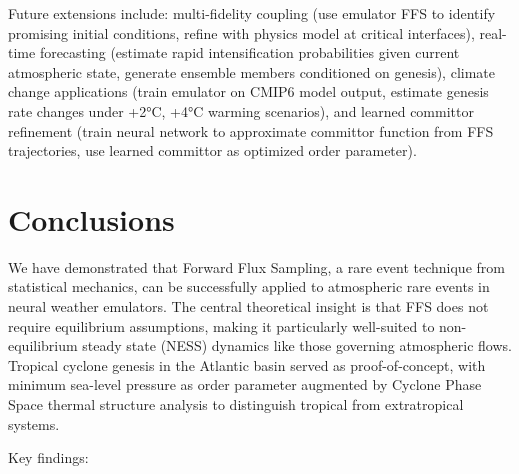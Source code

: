 \documentclass[11pt]{article}
\begin{document}
Future extensions include: multi-fidelity coupling (use emulator FFS to identify promising initial conditions, refine with physics model at critical interfaces), real-time forecasting (estimate rapid intensification probabilities given current atmospheric state, generate ensemble members conditioned on genesis), climate change applications (train emulator on CMIP6 model output, estimate genesis rate changes under +2°C, +4°C warming scenarios), and learned committor refinement (train neural network to approximate committor function from FFS trajectories, use learned committor as optimized order parameter).


\section{Conclusions}

We have demonstrated that Forward Flux Sampling, a rare event technique from statistical mechanics, can be successfully applied to atmospheric rare events in neural weather emulators. The central theoretical insight is that FFS does not require equilibrium assumptions, making it particularly well-suited to non-equilibrium steady state (NESS) dynamics like those governing atmospheric flows. Tropical cyclone genesis in the Atlantic basin served as proof-of-concept, with minimum sea-level pressure as order parameter augmented by Cyclone Phase Space thermal structure analysis to distinguish tropical from extratropical systems.

Key findings:
\end{document}
